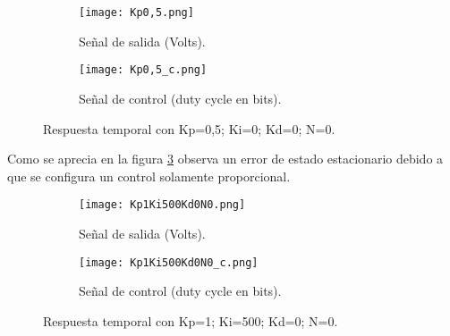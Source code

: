 \begin{figure}[H]
    \centering

    \begin{subfigure}[b]{0.49\textwidth}
        \centering
        \texttt{[image: Kp0,5.png]}
        \caption{Señal de salida (Volts).}
        \label{fig:pid_solokp_salida}
    \end{subfigure}
    \begin{subfigure}[b]{0.49\textwidth}
        \centering
        \texttt{[image: Kp0,5\_c.png]}
        \caption{Señal de control (duty cycle en bits).}
        \label{fig:pid_solokp_control}
    \end{subfigure}

    \vspace{-0.25cm}
    \caption{Respuesta temporal con Kp=0,5; Ki=0; Kd=0; N=0.}
    \label{fig:pid_solokp}
\end{figure}
\vspace{-0.5cm}

Como se aprecia en la figura \ref{fig:pid_solokp} observa un error de estado estacionario debido a que se configura un control
solamente proporcional.

\begin{figure}[H]
    \centering

    \begin{subfigure}[b]{0.49\textwidth}
        \centering
        \texttt{[image: Kp1Ki500Kd0N0.png]}
        \caption{Señal de salida (Volts).}
        \label{fig:pid_kialto_salida}
    \end{subfigure}
    \begin{subfigure}[b]{0.49\textwidth}
        \centering
        \texttt{[image: Kp1Ki500Kd0N0\_c.png]}
        \caption{Señal de control (duty cycle en bits).}
        \label{fig:pid_kialto_control}
    \end{subfigure}

    \vspace{-0.25cm}
    \caption{Respuesta temporal con Kp=1; Ki=500; Kd=0; N=0.}
    \label{fig:pid_kialto}
\end{figure}
\vspace{-0.5cm}

